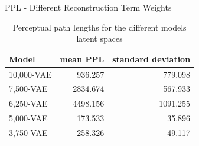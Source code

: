 \documentclass{beamer}
\begin{document}
\begin{frame}{PPL - Different Reconstruction Term Weights}
\begin{table}
\centering
\begin{tabular}{lrr}
\toprule
Model           & mean PPL & standard deviation \\
\midrule
10,000-VAE & 936.257       & 779.098            \\
7,500-VAE  & 2834.674      & 567.933            \\
6,250-VAE  & 4498.156      & 1091.255           \\
5,000-VAE  & 173.533       & 35.896             \\
3,750-VAE  & 258.326       & 49.117             \\
\bottomrule
\end{tabular}
\caption[dSprites-VAEs: Perceptual Path Lengths]{Perceptual path lengths for the different models latent spaces}
\end{table}
\end{frame}
\end{document}
